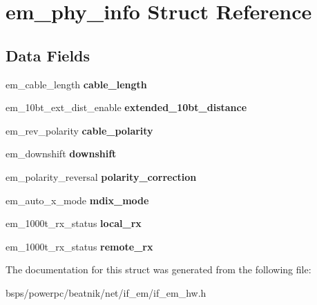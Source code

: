 \hypertarget{structem__phy__info}{}\section{em\+\_\+phy\+\_\+info Struct Reference}
\label{structem__phy__info}
\subsection*{Data Fields}
\begin{DoxyCompactItemize}
\item 
\mbox{\label{structem__phy__info_a242dfed1564ee4e3c34e2f588475532b}} 
em\+\_\+cable\+\_\+length {\bfseries cable\+\_\+length}
\item 
\mbox{\label{structem__phy__info_afc5743839d0405ce6890ce5feb62783b}} 
em\+\_\+10bt\+\_\+ext\+\_\+dist\+\_\+enable {\bfseries extended\+\_\+10bt\+\_\+distance}
\item 
\mbox{\label{structem__phy__info_a821f3b4f5b2067f127d620d434b0d787}} 
em\+\_\+rev\+\_\+polarity {\bfseries cable\+\_\+polarity}
\item 
\mbox{\label{structem__phy__info_a2ac2ab431aa45633a4ad88e7376e4234}} 
em\+\_\+downshift {\bfseries downshift}
\item 
\mbox{\label{structem__phy__info_a8680594a8d79703fb5a513599f0da2d3}} 
em\+\_\+polarity\+\_\+reversal {\bfseries polarity\+\_\+correction}
\item 
\mbox{\label{structem__phy__info_a5f1cdf9ca670007a0ae94cf8b5cd265e}} 
em\+\_\+auto\+\_\+x\+\_\+mode {\bfseries mdix\+\_\+mode}
\item 
\mbox{\label{structem__phy__info_a59de33239e57688d0e6d819572f4775b}} 
em\+\_\+1000t\+\_\+rx\+\_\+status {\bfseries local\+\_\+rx}
\item 
\mbox{\label{structem__phy__info_a5a1f12432208440d2358200a37e29adf}} 
em\+\_\+1000t\+\_\+rx\+\_\+status {\bfseries remote\+\_\+rx}
\end{DoxyCompactItemize}


The documentation for this struct was generated from the following file\+:\begin{DoxyCompactItemize}
\item 
bsps/powerpc/beatnik/net/if\+\_\+em/if\+\_\+em\+\_\+hw.\+h\end{DoxyCompactItemize}
